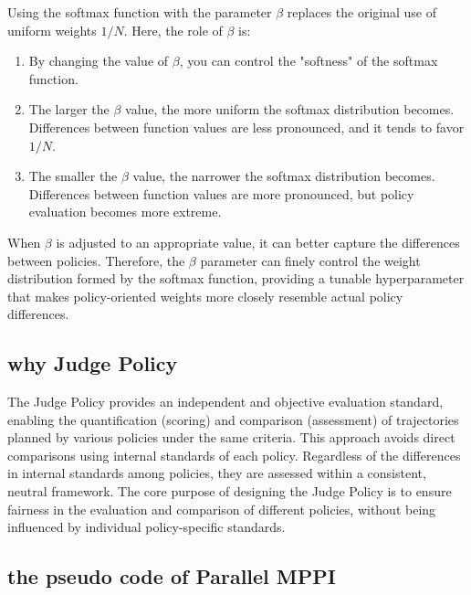 \documentclass{article}
\begin{document}
Using the softmax function with the parameter $\beta$ replaces the original use of uniform weights $1/N$. Here, the role of $\beta$ is:
\begin{enumerate}
	\item By changing the value of $\beta$, you can control the "softness" of the softmax function.
	\item The larger the $\beta$ value, the more uniform the softmax distribution becomes. Differences between function values are less pronounced, and it tends to favor $1/N$.
	\item The smaller the $\beta$ value, the narrower the softmax distribution becomes. Differences between function values are more pronounced, but policy evaluation becomes more extreme.
\end{enumerate}

When $\beta$ is adjusted to an appropriate value, it can better capture the differences between policies. Therefore, the $\beta$ parameter can finely control the weight distribution formed by the softmax function, providing a tunable hyperparameter that makes policy-oriented weights more closely resemble actual policy differences.

\subsection{why Judge Policy}
The Judge Policy provides an independent and objective evaluation standard, enabling the quantification (scoring) and comparison (assessment) of trajectories planned by various policies under the same criteria. This approach avoids direct comparisons using internal standards of each policy. Regardless of the differences in internal standards among policies, they are assessed within a consistent, neutral framework. The core purpose of designing the Judge Policy is to ensure fairness in the evaluation and comparison of different policies, without being influenced by individual policy-specific standards.


\subsection{the pseudo code of Parallel MPPI}
\end{document}
